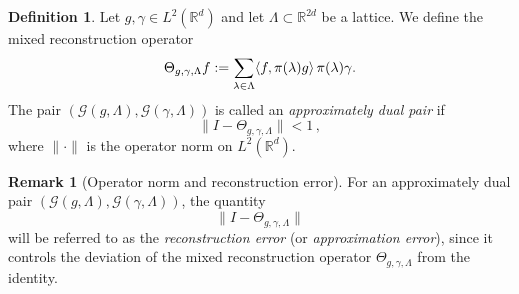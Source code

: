 \documentclass[final,1p,times,authoryear]{elsarticle}
\theoremstyle{definition}
\newtheorem{definition}[theorem]{Definition}
\newtheorem{remark}[theorem]{Remark}
\newcommand{\R}{\mathbb{R}}
\newcommand{\1}{\mathbf{1}}
\DeclarePairedDelimiter{\inner}{\langle}{\rangle}
\begin{document}
\begin{definition}
Let $g,\gamma\in L^2(\R^d)$ and let $\Lambda\subset \R^{2d}$ be a lattice.
We define the mixed reconstruction operator
$$
\Theta_{g,\gamma,\Lambda}f
:=
\sum_{\lambda\in\Lambda}\inner{f,\pi(\lambda)g}\,\pi(\lambda)\gamma.
$$
The pair $(\mathcal G(g,\Lambda),\mathcal G(\gamma,\Lambda))$ is called an
\emph{approximately dual pair} if
$$
\|I-\Theta_{g,\gamma,\Lambda}\|<1\, ,
$$
where $\|\cdot\|$ is the operator norm on $L^2(\R^d)$.
\end{definition}
\begin{remark}[Operator norm and reconstruction error]\label{rem:operator_norm_error}
For an approximately dual pair $(\mathcal G(g,\Lambda),\mathcal G(\gamma,\Lambda))$, the quantity
$$\|I-\Theta_{g,\gamma,\Lambda}\|$$
will be referred to as the \emph{reconstruction error} (or \emph{approximation error}), since it controls the
deviation of the mixed reconstruction operator $\Theta_{g,\gamma,\Lambda}$ from the identity.
\end{remark}
\end{document}
